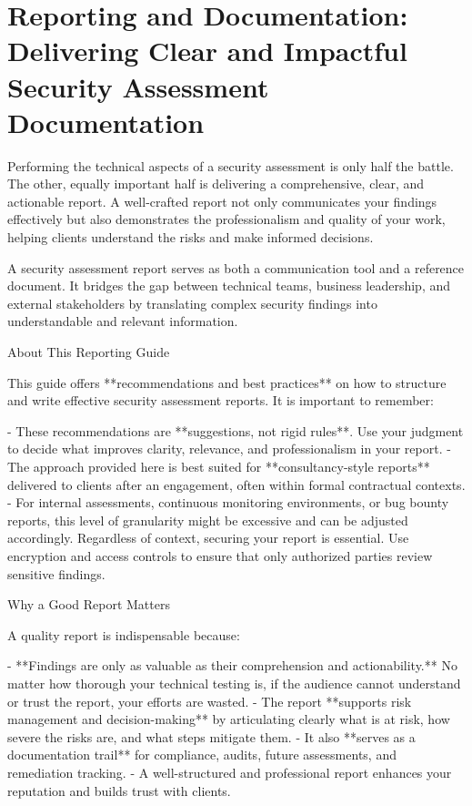 \chapter{Reporting and Documentation: Delivering Clear and Impactful Security Assessment Documentation}

Performing the technical aspects of a security assessment is only half the battle. The other, equally important half is delivering a comprehensive, clear, and actionable report. A well-crafted report not only communicates your findings effectively but also demonstrates the professionalism and quality of your work, helping clients understand the risks and make informed decisions.

A security assessment report serves as both a communication tool and a reference document. It bridges the gap between technical teams, business leadership, and external stakeholders by translating complex security findings into understandable and relevant information.


About This Reporting Guide

This guide offers **recommendations and best practices** on how to structure and write effective security assessment reports. It is important to remember:

- These recommendations are **suggestions, not rigid rules**. Use your judgment to decide what improves clarity, relevance, and professionalism in your report.
- The approach provided here is best suited for **consultancy-style reports** delivered to clients after an engagement, often within formal contractual contexts.
- For internal assessments, continuous monitoring environments, or bug bounty reports, this level of granularity might be excessive and can be adjusted accordingly.
Regardless of context, securing your report is essential. Use encryption and access controls to ensure that only authorized parties review sensitive findings.

Why a Good Report Matters

A quality report is indispensable because:

- **Findings are only as valuable as their comprehension and actionability.** No matter how thorough your technical testing is, if the audience cannot understand or trust the report, your efforts are wasted.
- The report **supports risk management and decision-making** by articulating clearly what is at risk, how severe the risks are, and what steps mitigate them.
- It also **serves as a documentation trail** for compliance, audits, future assessments, and remediation tracking.
- A well-structured and professional report enhances your reputation and builds trust with clients.


